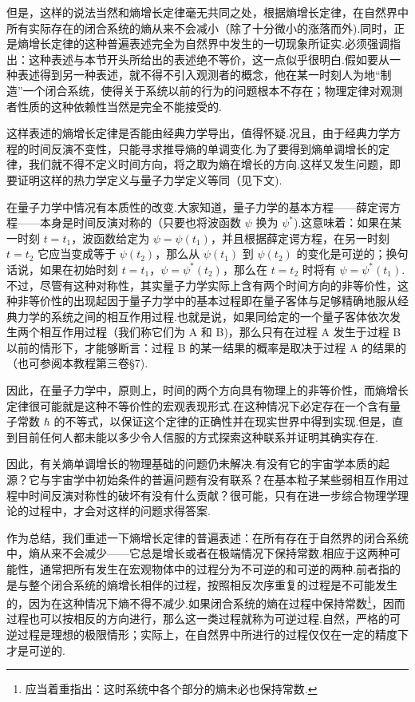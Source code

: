但是，这样的说法当然和熵增长定律毫无共同之处，根据熵增长定律，在自然界中所有实际存在的闭合系统的熵从来不会减小（除了十分微小的涨落而外).同时，正是熵增长定律的这种普遍表述完全为自然界中发生的一切现象所证实.必须强调指出：这种表述与本节开头所给出的表述绝不等价，这一点似乎很明白.假如要从一种表述得到另一种表述，就不得不引入观测者的概念，他在某一时刻人为地“制造”一个闭合系统，使得关于系统以前的行为的问题根本不存在；物理定律对观测者性质的这种依赖性当然是完全不能接受的.

这样表述的熵增长定律是否能由经典力学导出，值得怀疑.况且，由于经典力学方程的时间反演不变性，只能寻求推导熵的单调变化.为了要得到熵单调增长的定律，我们就不得不定义时间方向，将之取为熵在增长的方向.这样又发生问题，即要证明这样的热力学定义与量子力学定义等同（见下文).

在量子力学中情况有本质性的改变.大家知道，量子力学的基本方程——薛定谔方程——本身是时间反演对称的（只要也将波函数 $\psi$ 换为 $\psi^{*}$).这意味着：如果在某一时刻 $t=t_1$，波函数给定为 $\psi=\psi(t_1)$，并且根据薛定谔方程，在另一时刻 $t=t_2$ 它应当变成等于 $\psi(t_2)$，那么从 $\psi(t_1)$ 到 $\psi(t_2)$ 的变化是可逆的；换句话说，如果在初始时刻 $t=t_1$，$\psi=\psi^{*}(t_2)$，那么在 $t=t_2$ 时将有 $\psi=\psi^{*}(t_1)$.不过，尽管有这种对称性，其实量子力学实际上含有两个时间方向的非等价性，这种非等价性的出现起因于量子力学中的基本过程即在量子客体与足够精确地服从经典力学的系统之间的相互作用过程.也就是说，如果同给定的一个量子客体依次发生两个相互作用过程（我们称它们为 A 和 B)，那么只有在过程 A 发生于过程 B 以前的情形下，才能够断言：过程 B 的某一结果的概率是取决于过程 A 的结果的（也可参阅本教程第三卷§7).

因此，在量子力学中，原则上，时间的两个方向具有物理上的非等价性，而熵增长定律很可能就是这种不等价性的宏观表现形式.在这种情况下必定存在一个含有量子常数 $\hbar$ 的不等式，以保证这个定律的正确性并在现实世界中得到实现.但是，直到目前任何人都未能以多少令人信服的方式探索这种联系并证明其确实存在.

因此，有关熵单调增长的物理基础的问题仍未解决.有没有它的宇宙学本质的起源？它与宇宙学中初始条件的普遍问题有没有联系？在基本粒子某些弱相互作用过程中时间反演对称性的破坏有没有什么贡献？很可能，只有在进一步综合物理学理论的过程中，才会对这样的问题求得答案.

作为总结，我们重述一下熵增长定律的普遍表述：在所有存在于自然界的闭合系统中，熵从来不会减少——它总是增长或者在极端情况下保持常数.相应于这两种可能性，通常把所有发生在宏观物体中的过程分为不可逆的和可逆的两种.前者指的是与整个闭合系统的熵增长相伴的过程，按照相反次序重复的过程是不可能发生的，因为在这种情况下熵不得不减少.如果闭合系统的熵在过程中保持常数\footnote{应当着重指出：这时系统中各个部分的熵未必也保持常数.}，因而过程也可以按相反的方向进行，那么这一类过程就称为可逆过程.自然，严格的可逆过程是理想的极限情形；实际上，在自然界中所进行的过程仅仅在一定的精度下才是可逆的.
